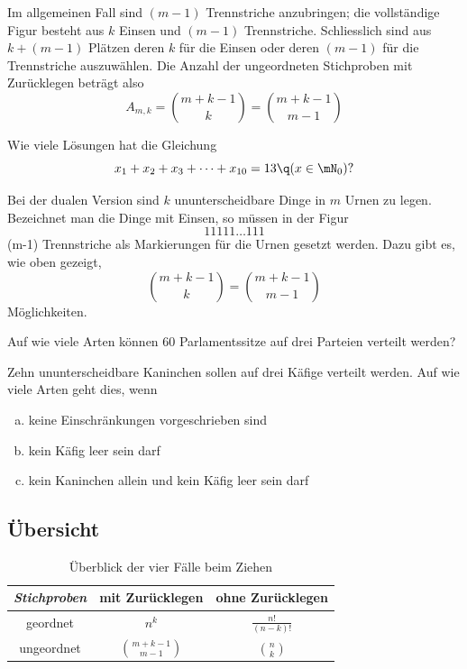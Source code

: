 \documentclass[%
11pt,%
twoside,%
titlepage,%
german,%
headsepline%
]{scrartcl}
\newcommand{\spaltenheight}{\rule{0mm}{3ex}}
\newcommand{\spaltensep}{\\[1ex]}
\begin{document}
Im allgemeinen Fall sind $(m-1)$ Trennstriche anzubringen; die vollständige Figur besteht aus $k$ Einsen und $(m-1)$ Trennstriche. Schliesslich sind aus $k+(m-1)$ Plätzen deren $k$ für die Einsen oder deren $(m-1)$ für die Trennstriche auszuwählen.
Die Anzahl der ungeordneten Stichproben mit Zurücklegen beträgt also
$$A_{m,k}=\binom{m+k-1}{k}=\binom{m+k-1}{m-1}$$

\begin{ueb}
Wie viele Lösungen hat die Gleichung
$$x_1+x_2+x_3+\dots+x_{10}=13\q (x\in\mN_0)?$$
\end{ueb}

Bei der dualen Version sind $k$ ununterscheidbare Dinge in $m$ Urnen zu legen. Bezeichnet man die Dinge mit Einsen, so müssen in der Figur
$$11111\dots111$$
(m-1) Trennstriche als Markierungen für die Urnen gesetzt werden. Dazu gibt es, wie oben gezeigt,
$$\binom{m+k-1}{k}=\binom{m+k-1}{m-1}$$
Möglichkeiten.

\begin{ueb}[Parlamentssitze]
Auf wie viele Arten können 60 Parlamentssitze auf drei Parteien verteilt werden?
\end{ueb}

\begin{ueb}[Kaninchen]
Zehn ununterscheidbare Kaninchen sollen auf drei Käfige verteilt werden. Auf wie viele Arten geht dies, wenn
\begin{enumerate}[a)]
\item keine Einschränkungen vorgeschrieben sind
\item kein Käfig leer sein darf
\item kein Kaninchen allein und kein Käfig leer sein darf
\end{enumerate}
\end{ueb}

\subsection{Übersicht}

\begin{table}[h]
\large
\centering
\begin{tabular}{|c|c|c|} \hline
\rowcolor{Gray}\spaltenheight \emph{Stichproben} & mit Zurücklegen & ohne Zurücklegen\spaltensep\hline
\rowcolor{lightyellow}\spaltenheight geordnet & $n^k$ & $\frac{n!}{(n-k)!}$\spaltensep \hline
\rowcolor{Gray}\spaltenheight ungeordnet & $\binom{m+k-1}{m-1}$ & $\binom{n}{k}$\spaltensep \hline
\end{tabular}
\caption{Überblick der vier Fälle beim Ziehen}
\end{table}
\end{document}
